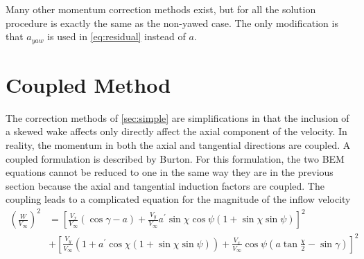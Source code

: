 \documentclass[]{aiaa-tc}%
\begin{document}

Many other momentum correction methods exist, but for all the solution procedure is exactly the same as the non-yawed case.  The only modification is that $a_{yaw}$ is used in \cref{eq:residual} instead of $a$. 


\section{Coupled Method}
\label{sec:coupled}
The correction methods of \cref{sec:simple} are simplifications in that the inclusion of a skewed wake affects only directly affect the axial component of the velocity.  In reality, the momentum in both the axial and tangential directions are coupled.  A coupled formulation is described by Burton\cite{Burton2011}.  For this formulation, the two BEM equations cannot be reduced to one in the same way they are in the previous section because the axial and tangential induction factors are coupled.  The coupling leads to a complicated equation for the magnitude of the inflow velocity
\begin{align}
    \left(\frac{W}{V_\infty}\right)^2 &= \left[\frac{V_x}{V_\infty} \left( \cos\gamma - a\right) + \frac{V_y}{V_\infty} a^\prime \sin\chi\cos\psi(1 + \sin\chi\sin\psi)\right]^2 \\
    &+ 
    \left[\frac{V_y}{V_\infty} \left( 1 + a^\prime\cos\chi(1 + \sin\chi\sin\psi)\right) + \frac{V_x}{V_\infty} \cos\psi (a \tan\frac{\chi}{2} - \sin\gamma) \right]^2
\end{align}
\end{document}
